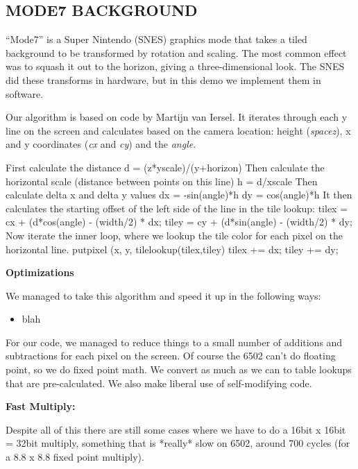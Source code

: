 \documentclass[twocolumn]{article}
\begin{document}
\subsection{MODE7 BACKGROUND}

``Mode7'' is a Super Nintendo (SNES) graphics mode that takes a tiled
background to be transformed by rotation and scaling.
The most common effect was to squash it out to the horizon, giving
a three-dimensional look.
The SNES did these transforms in hardware, but in this demo we implement
them in software.

%

Our algorithm is based on code by Martijn van Iersel.
It iterates through each y line on the screen and calculates based on
the camera location: height ({\em spacez}), x and y coordinates 
({\em cx} and {\em cy}) and the {\em angle}.

First calculate the distance
	d = (z*yscale)/(y+horizon)
Then calculate the horizontal scale (distance between points on 
this line)
	h = d/xscale
Then calculate delta x and delta y values
	dx = -sin(angle)*h
	dy = cos(angle)*h
It then calculates the starting offset of the left side of the line in
the tile lookup:
        tilex = cx + (d*cos(angle) - (width/2) * dx;
        tiley = cy + (d*sin(angle) - (width/2) * dy;
Now iterate the inner loop, where we lookup the tile color for each pixel
on the horizontal line.
            putpixel (x, y, tilelookup(tilex,tiley)
            tilex += dx;
            tiley += dy;

{\bf Optimizations}

We managed to take this algorithm and speed it up in the following ways:
	\begin{itemize}
	\item blah 
	\end{itemize}
 
  For our code, we managed to reduce things to a small number of additions
  and subtractions for each pixel on the screen.  Of course the 6502 can't
  do floating point, so we do fixed point math.  We convert as much as we
  can to table lookups that are pre-calculated.  We also make liberal use
  of self-modifying code.

{\bf Fast Multiply:}

  Despite all of this there are still some cases where we have to do a 
  16bit x 16bit = 32bit multiply, something that is *really* slow on 6502,
  around 700 cycles (for a 8.8 x 8.8 fixed point multiply).
\end{document}
